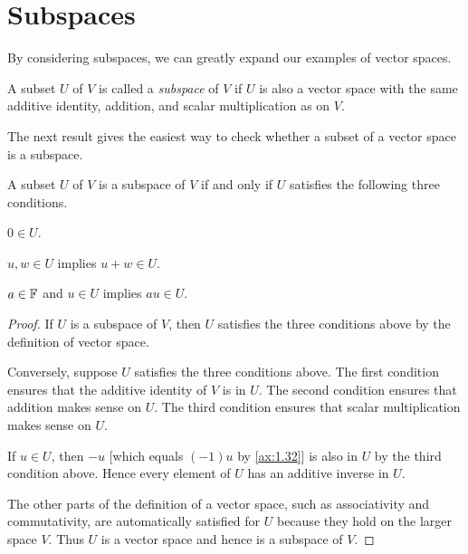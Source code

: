 \section{Subspaces}

By considering subspaces, we can greatly expand our examples of vector spaces.

\begin{definition}[Subspace]\label{ax:1.33}
A subset $U$ of $V$ is called a \emph{subspace} of $V$ if $U$ is also a vector
space with the same additive identity, addition, and scalar multiplication as
on $V$.
\end{definition}

%
The next result gives the easiest way to check whether a subset of a vector
space is a subspace.

\begin{result}\label{ax:1.34}
A subset $U$ of $V$ is a subspace of $V$ if and only if $U$ satisfies the
following three conditions.
\begin{axprops}
\item[additive identity] $0\in U$.
\item[closed under addition] $u,w\in U$ implies $u+w\in U$.
\item[closed under scalar multiplication] $a\in\mathbb{F}$ and $u\in U$ implies
  $au\in U$.
\end{axprops}
\end{result}

\begin{proof}
If $U$ is a subspace of $V$, then $U$ satisfies the three conditions above by
the definition of vector space.

Conversely, suppose $U$ satisfies the three conditions above. The first
condition ensures that the additive identity of $V$ is in $U$. The second
condition ensures that addition makes sense on $U$. The third condition ensures
that scalar multiplication makes sense on $U$.

%
If $u\in U$, then $-u$ [which equals $(-1)u$ by \ref{ax:1.32}] is also in $U$
by the third condition above. Hence every element of $U$ has an additive
inverse in $U$.

The other parts of the definition of a vector space, such as associativity and
commutativity, are automatically satisfied for $U$ because they hold on the
larger space $V$. Thus $U$ is a vector space and hence is a subspace of $V$.
\end{proof}

